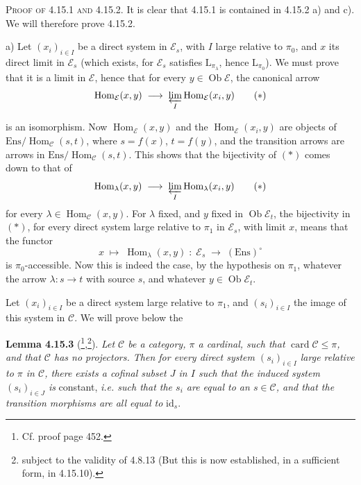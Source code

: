\documentclass[11pt]{article}
\newcommand{\printedpage}[1]{\marginpar{\footnotesize p.~#1}}
\newcommand{\msp}[1]{\marginpar{\footnotesize [#1]}}
\newcommand{\cE}{\mathcal{E}}
\newcommand{\cC}{\mathcal{C}}
\newcommand{\Ob}{\operatorname{Ob}}
\newcommand{\Hom}{\operatorname{Hom}}
\newcommand{\Ens}{\mathrm{Ens}}
\newcommand{\id}{\mathrm{id}}
\newcommand{\card}{\operatorname{card}}
\begin{document}
\msp{page 427}
\textsc{Proof of 4.15.1 and 4.15.2.} It is clear that 4.15.1 is contained in 4.15.2 a) and c). We will therefore prove 4.15.2.

a) Let $(x_i)_{i\in I}$ be a direct system in $\cE_s$, with $I$ large relative to $\pi_0$, and $x$ its direct limit in $\cE_s$ (which exists, for $\cE_s$ satisfies $\mathrm{L}_{\pi_\lambda}$, hence $\mathrm{L}_{\pi_0}$). We must prove that it is a limit in $\cE$, hence that for every $y \in \Ob\cE$, the canonical arrow
\[
\Hom_{\cE}(x,y) \;\longrightarrow\; \varprojlim_{I} \Hom_{\cE}(x_i,y) \tag*{$(*)$}
\]

\printedpage{163}
is an isomorphism. Now $\Hom_{\cE}(x,y)$ and the $\Hom_{\cE}(x_i,y)$ are objects of $\Ens/\Hom_{\cC}(s,t)$, where $s = f(x)$, $t = f(y)$, and the transition arrows are arrows in $\Ens/\Hom_{\cC}(s,t)$. This shows that the bijectivity of $(*)$ comes down to that of
\[
\Hom_\lambda(x,y) \;\longrightarrow\; \varprojlim_{I} \Hom_\lambda(x_i,y) \tag*{$(*)$}
\]
for every $\lambda \in \Hom_{\cC}(x,y)$. For $\lambda$ fixed, and $y$ fixed in $\Ob\cE_t$, the bijectivity in $(*)$, for every direct system large relative to $\pi_1$ in $\cE_s$, with limit $x$, means that the functor
\[
x \;\longmapsto\; \Hom_\lambda(x,y) \;:\; \cE_s \;\longrightarrow\; (\Ens)^\circ
\]
is $\pi_0$-accessible. Now this is indeed the case, by the hypothesis on $\pi_1$, whatever the arrow $\lambda : s \longrightarrow t$ with source $s$, and whatever $y \in \Ob\cE_t$.

\msp{page 428}
Let $(x_i)_{i\in I}$ be a direct system large relative to $\pi_1$, and $(s_i)_{i\in I}$ the image of this system in $\cC$. We will prove below the

\textbf{Lemma 4.15.3} (\footnote{Cf. proof page 452.},\footnote{subject to the validity of 4.8.13 (But this is now established, in a sufficient form, in 4.15.10).}). \textit{Let $\cC$ be a category, $\pi$ a cardinal, such that} $\card\cC \leqslant \pi$\textit{, and that $\cC$ has no projectors. Then for every direct system $(s_i)_{i\in I}$ large relative to $\pi$ in $\cC$, there exists a cofinal subset $J$ in $I$ such that the induced system $(s_i)_{i\in J}$ is} constant, \textit{i.e. such that the $s_i$ are equal to an $s \in \cC$, and that the transition morphisms are all equal to} $\id_s$.
\end{document}
